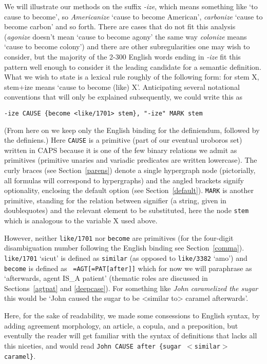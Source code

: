 \documentclass[11pt,bookmarks,bookmarksnumbered,naturalnames,plainpages=false,pdftex,colorlinks=true,urlcolor=blue,bookmarksdepth=subsection,plainpages=false]{paper}
\begin{document}
We will illustrate our methods on the suffix {\it -ize}, which means something
like `to cause to become', so {\it Americanize} `cause to become American',
{\it carbonize} `cause to become carbon' and so forth. There are cases that do
not fit this analysis ({\it agonize} doesn't mean `cause to become agony' the
same way {\it colonize} means `cause to become colony') and there are other
subregularities one may wish to consider, but the majority of the 2-300
English words ending in {\it -ize} fit this pattern well enough to consider it
the leading candidate for a semantic definition. What we wish to state is a
lexical rule roughly of the following form: for stem X, stem+ize means `cause
to become (like) X'. Anticipating several notational conventions that will
only be explained subsequently, we could write this as 

\begin{verbatim}
-ize CAUSE {become <like/1701> stem}, "-ize" MARK stem
\end{verbatim}

\noindent 
(From here on we keep only the English binding for the definiendum, followed
by the definiens.) Here {\tt CAUSE} is a primitive (part of our eventual
uroboros set) written in CAPS because it is one of the few binary relations we
admit as primitives (primitive unaries and variadic predicates are written
lowercase).  The curly braces (see Section~\ref{parens}) denote a single
hypergraph node (pictorially, all formulas will correspond to hypergraphs) and
the angled brackets signify optionality, enclosing the default option (see
Section~\ref{default}). {\tt MARK} is another primitive, standing for the
relation between signifier (a string, given in doublequotes) and the relevant
element to be substituted, here the node {\tt stem} which is analogous to the
variable X used above. 

However, neither {\tt like/1701} nor {\tt become} are primitives (for the
four-digit disambiguation number following the English binding see
Section~\ref{comma}). {\tt like/1701} `sicut' is defined as {\tt similar} (as
opposed to {\tt like/3382} `amo') and {\tt become} is defined as {\tt
  =AGT[=PAT[after]]} which for now we will paraphrase as `afterwards, agent
IS\_A patient' (thematic roles are discussed in Sections~\ref{agtpat} and
\ref{deepcase}). For something like {\it John caramelized the sugar} this 
would be `John caused the sugar to be <similar to> caramel afterwards'. 

Here, for the sake of readability, we made some consessions to English syntax,
by adding agreement morphology, an article, a copula, and a preposition, but
eventully the reader will get familiar with the syntax of definitions that
lacks all this niceties, and would read {\tt John CAUSE after \{sugar $<$similar$>$
    caramel\}}. 
\end{document}
